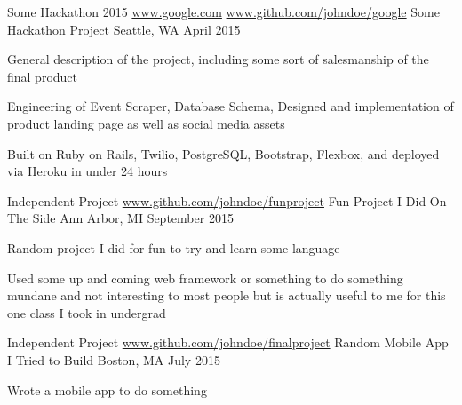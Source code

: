 \begin{cventries}
  \cventry
    {Some Hackathon 2015 \url{www.google.com} \url{www.github.com/johndoe/google}}
    {Some Hackathon Project}
    {Seattle, WA}
    {April 2015}
    {
      \begin{cvitems}
        \item {General description of the project, including some sort of salesmanship of the final product}
        \item {Engineering of Event Scraper, Database Schema, Designed and implementation of product landing page as well as social media assets}
        \item {Built on Ruby on Rails, Twilio, PostgreSQL, Bootstrap, Flexbox, and deployed via Heroku in under 24 hours}
      \end{cvitems}
    }
  \cventry
    {Independent Project \url{www.github.com/johndoe/funproject}}
    {Fun Project I Did On The Side}
    {Ann Arbor, MI}
    {September 2015}
    {
      \begin{cvitems}
        \item {Random project I did for fun to try and learn some language}
        \item {Used some up and coming web framework or something to do something mundane and not interesting to most people but is actually useful to me for this one class I took in undergrad}
      \end{cvitems}
    }
  \cventry
    {Independent Project \url{www.github.com/johndoe/finalproject}}
    {Random Mobile App I Tried to Build}
    {Boston, MA}
    {July 2015}
    {
     \begin{cvitems}
      \item {Wrote a mobile app to do something}
     \end{cvitems}
    }
\end{cventries}
